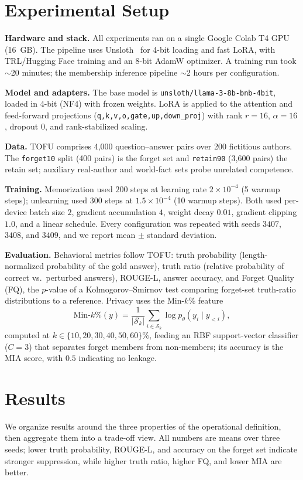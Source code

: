 \documentclass[journal]{IEEEtran}
\begin{document}
\section{Experimental Setup}
\label{sec:setup}
\textbf{Hardware and stack.} All experiments ran on a single Google Colab T4 GPU (16~GB). The pipeline uses Unsloth~\cite{han2023unsloth} for 4-bit loading and fast LoRA, with TRL/Hugging Face training and an 8-bit AdamW optimizer. A training run took $\sim$20 minutes; the membership inference pipeline $\sim$2 hours per configuration.

\textbf{Model and adapters.} The base model is \texttt{unsloth/llama-3-8b-bnb-4bit}, loaded in 4-bit (NF4) with frozen weights. LoRA is applied to the attention and feed-forward projections (\texttt{q,k,v,o,gate,up,down\_proj}) with rank $r=16$, $\alpha=16$, dropout $0$, and rank-stabilized scaling.

\textbf{Data.} TOFU comprises 4{,}000 question--answer pairs over 200 fictitious authors. The \texttt{forget10} split (400 pairs) is the forget set and \texttt{retain90} (3{,}600 pairs) the retain set; auxiliary real-author and world-fact sets probe unrelated competence.

\textbf{Training.} Memorization used $200$ steps at learning rate $2\times10^{-4}$ (5 warmup steps); unlearning used $300$ steps at $1.5\times10^{-4}$ (10 warmup steps). Both used per-device batch size $2$, gradient accumulation $4$, weight decay $0.01$, gradient clipping $1.0$, and a linear schedule. Every configuration was repeated with seeds $3407$, $3408$, and $3409$, and we report mean $\pm$ standard deviation.

\textbf{Evaluation.} Behavioral metrics follow TOFU: truth probability (length-normalized probability of the gold answer), truth ratio (relative probability of correct vs.\ perturbed answers), ROUGE-L, answer accuracy, and Forget Quality (FQ), the $p$-value of a Kolmogorov--Smirnov test comparing forget-set truth-ratio distributions to a reference. Privacy uses the Min-$k$\% feature
\begin{equation}
\mathrm{Min\text{-}}k\%(y) = \frac{1}{|\mathcal{S}_k|}\sum_{i\in\mathcal{S}_k}\log p_\theta(y_i\mid y_{<i}),
\label{eq:mink}
\end{equation}
computed at $k\in\{10,20,30,40,50,60\}\%$, feeding an RBF support-vector classifier ($C=3$) that separates forget members from non-members; its accuracy is the MIA score, with $0.5$ indicating no leakage.

\section{Results}
\label{sec:results}
We organize results around the three properties of the operational definition, then aggregate them into a trade-off view. All numbers are means over three seeds; lower truth probability, ROUGE-L, and accuracy on the forget set indicate stronger suppression, while higher truth ratio, higher FQ, and lower MIA are better.
\end{document}
